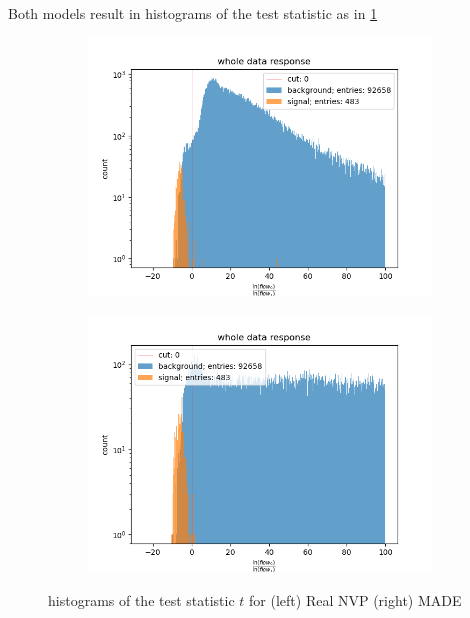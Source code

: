 \documentclass[%
 reprint,
 amsmath,amssymb,
 aps,
]{revtex4-2}
\begin{document}
Both models result in histograms of the test statistic as in \ref{fig:histt}
 \begin{figure}[ht]
	\centering
	\begin{subfigure}[h]{0.475\textwidth}
		\centering
		\includegraphics[width=\textwidth]{figs/fracln_data_hist_Real_NVP.png}
	\end{subfigure}
	\hfill
	\begin{subfigure}[h]{0.475\textwidth}  
		\centering 
		\includegraphics[width=\textwidth]{figs/fracln_data_hist_MADE.png} 
	\end{subfigure}
	\caption[ histograms of the test statistic $t$ for (left) Real NVP (right) MADE ]
	{\small histograms of the test statistic $t$ for (left) Real NVP (right) MADE} 
	\label{fig:histt}
\end{figure}
\end{document}
